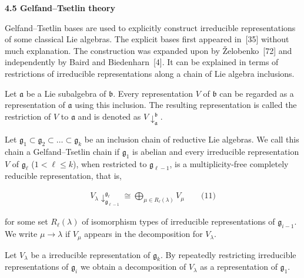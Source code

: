 \documentclass[10pt,a4paper]{article}
\begin{document}
\par\medskip\noindent\textbf{4.5 Gelfand–Tsetlin theory}\par




Gelfand–Tsetlin bases are used to explicitly construct irreducible representations of some classical Lie algebras.
The explicit bases first appeared in [35] without much explanation.
The construction was expanded upon by Želobenko [72] and independently by Baird and Biedenharn [4].
It can be explained in terms of restrictions of irreducible representations along a chain of Lie algebra inclusions.





Let $\mathfrak{a}$ be a Lie subalgebra of $\mathfrak{b}$.
Every representation $V$ of $\mathfrak{b}$ can be regarded as a representation of $\mathfrak{a}$ using this inclusion.
The resulting representation is called the restriction of $V$ to $\mathfrak{a}$ and is denoted as $V{\downarrow}^{\mathfrak{b}}_{\mathfrak{a}}$.





Let $\mathfrak{g}_{1}\subset\mathfrak{g}_{2}\subset\dots\subset\mathfrak{g}_{k}$ be an inclusion chain of reductive Lie algebras.
We call this chain a Gelfand–Tsetlin chain if $\mathfrak{g}_{1}$ is abelian and every irreducible representation $V$ of $\mathfrak{g}_{\ell}$ ($1<\ell\leq k$), when restricted to $\mathfrak{g}_{\ell-1}$, is a multiplicity-free completely reducible representation, that is,



\[\begin{aligned}
\displaystyle V_{\lambda}{\downarrow}^{\mathfrak{g}_{\ell}}_{\mathfrak{g}_{\ell-1}}\cong\bigoplus_{\mu\in R_{\ell}(\lambda)}V_{\mu}\qquad\text{(11)}
\end{aligned}\]


for some set $R_{\ell}(\lambda)$ of isomorphism types of irreducible representations of $\mathfrak{g}_{i-1}$.
We write $\mu\to\lambda$ if $V_{\mu}$ appears in the decomposition for $V_{\lambda}$.





Let $V_{\lambda}$ be a irreducible representation of $\mathfrak{g}_{k}$.
By repeatedly restricting irreducible representations of $\mathfrak{g}_{i}$ we obtain a decomposition of $V_{\lambda}$ as a representation of $\mathfrak{g}_{1}$.
\end{document}
